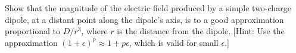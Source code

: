 Show that the magnitude of the electric field produced
by a simple two-charge dipole, at a distant point along the
dipole's axis, is to a good approximation proportional to
$D/r^3$, where $r$ is the distance from the dipole. [Hint:
Use the approximation $(1+\epsilon)^p\approx 1+p\epsilon$, which is valid for small $\epsilon $.]
